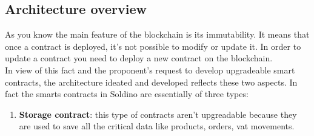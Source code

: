 \subsection{Architecture overview}
As you know the main feature of the blockchain is its immutability. It means that once a contract is 
deployed, it's not possible to modify or update it. In order to update a contract you need to deploy 
a new contract on the blockchain.\\
In view of this fact and the proponent's request to develop upgradeable smart contracts, the architecture ideated and developed reflects these two aspects. In fact the smarts contracts in Soldino
are essentially of three types:
\begin{enumerate}
	\item\textbf{Storage contract}: this type of contracts aren't upgreadable because they are used
		to save all the critical data like products, orders, vat movements. 
\end{enumerate}

